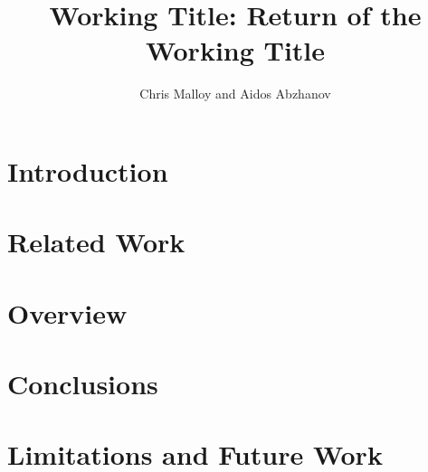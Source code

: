 \documentclass[twocolumn,11pt,notitlepage,oneside]{article}
\title{Working Title: Return of the Working Title}
\author{Chris Malloy and Aidos Abzhanov}
\date{}
\begin{document}
\maketitle

\section{Introduction}


\section{Related Work}


\section{Overview}


\section{Conclusions}


\section{Limitations and Future Work}



\nocite{*}


\end{document}

